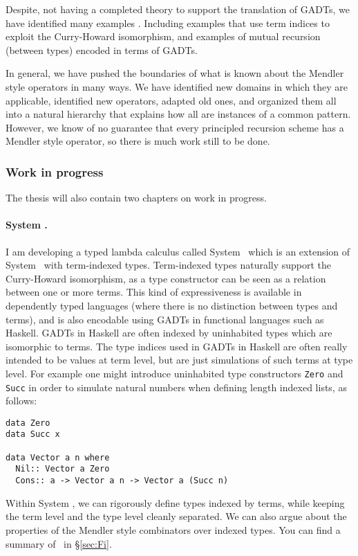 Despite, not having a completed theory to support the translation of GADTs,
we have identified many examples \cite{AhnShe11}. Including examples
that use term indices to exploit the Curry-Howard isomorphism, and
examples of mutual recursion (between types) encoded in terms of GADTs.

In general, we have pushed the boundaries of what is known about
the Mendler style operators in many ways. We have identified new domains
in which they are applicable, identified new operators, adapted old ones,
and organized them all into a natural hierarchy that explains how all are
instances of a common pattern. However, we know of no guarantee that every
principled recursion scheme has a Mendler style operator, so there is
much work still to be done.


\subsubsection{Work in progress} \label{Fi}

The thesis will also contain two chapters on work in progress.

\paragraph{System \Fi.}
I am developing a typed lambda calculus called System \Fi\, which is an
extension of System \Fw\ with term-indexed types. Term-indexed types
naturally support the Curry-Howard isomorphism, as a type constructor can be
seen as a relation between one or more terms.  This kind of expressiveness is
available in dependently typed languages (where there is no distinction between
types and terms), and is also encodable using GADTs in functional languages
such as Haskell.  GADTs in Haskell are often indexed by uninhabited types
which are isomorphic to terms. The type indices used in GADTs in Haskell are
often really intended to be values at term level, but are just simulations of
such terms at type level.  For example one might introduce uninhabited type
constructors \verb+Zero+ and \verb+Succ+ in order to simulate natural numbers
when defining length indexed lists, as follows:
\begin{verbatim}
data Zero
data Succ x

data Vector a n where
  Nil:: Vector a Zero
  Cons:: a -> Vector a n -> Vector a (Succ n)
\end{verbatim}  

Within System \Fi, we can rigorously define types indexed by terms,
while keeping the term level and the type level cleanly separated.
We can also argue about the properties of the Mendler style combinators
over indexed types.  You can find a summary of \Fi\ in \S\ref{sec:Fi}.

